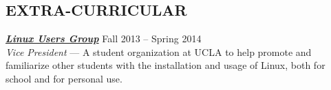 \documentclass[line,letterpaper]{resume}
\begin{document}
\begin{resume}
    \section{\uppercase{Extra-Curricular}}
    {\sl\textbf{\href{linux.ucla.edu}{Linux Users Group}}} \hfill Fall 2013 -- Spring 2014\\
    \emph{Vice President} --- A student organization at UCLA to help promote
	and familiarize other students with the installation and usage of Linux,
	both for school and for personal use.

\end{resume}
\end{document}
